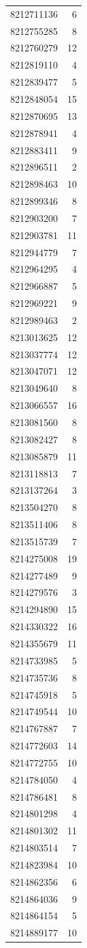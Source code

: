 \documentclass[
]{article}
\begin{document}
\begin{longtable}[]{@{}rr@{}}
8212711136 & 6 \\
8212755285 & 8 \\
8212760279 & 12 \\
8212819110 & 4 \\
8212839477 & 5 \\
8212848054 & 15 \\
8212870695 & 13 \\
8212878941 & 4 \\
8212883411 & 9 \\
8212896511 & 2 \\
8212898463 & 10 \\
8212899346 & 8 \\
8212903200 & 7 \\
8212903781 & 11 \\
8212944779 & 7 \\
8212964295 & 4 \\
8212966887 & 5 \\
8212969221 & 9 \\
8212989463 & 2 \\
8213013625 & 12 \\
8213037774 & 12 \\
8213047071 & 12 \\
8213049640 & 8 \\
8213066557 & 16 \\
8213081560 & 8 \\
8213082427 & 8 \\
8213085879 & 11 \\
8213118813 & 7 \\
8213137264 & 3 \\
8213504270 & 8 \\
8213511406 & 8 \\
8213515739 & 7 \\
8214275008 & 19 \\
8214277489 & 9 \\
8214279576 & 3 \\
8214294890 & 15 \\
8214330322 & 16 \\
8214355679 & 11 \\
8214733985 & 5 \\
8214735736 & 8 \\
8214745918 & 5 \\
8214749544 & 10 \\
8214767887 & 7 \\
8214772603 & 14 \\
8214772755 & 10 \\
8214784050 & 4 \\
8214786481 & 8 \\
8214801298 & 4 \\
8214801302 & 11 \\
8214803514 & 7 \\
8214823984 & 10 \\
8214862356 & 6 \\
8214864036 & 9 \\
8214864154 & 5 \\
8214889177 & 10 \\
\end{longtable}
\end{document}
